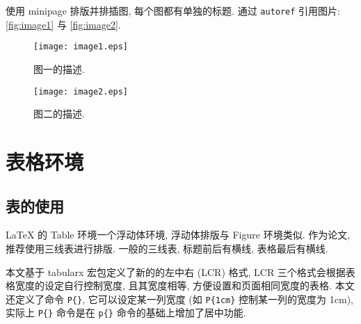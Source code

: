 \documentclass[openany,twoside,12pt]{book}
\theoremstyle{plain}
\begin{document}
使用 minipage 排版并排插图, 每个图都有单独的标题. 通过 \verb|autoref| 引用图片: \autoref{fig:image1} 与 \autoref{fig:image2}.
\begin{figure}[htp!]
\begin{minipage}[t]{0.48\linewidth}
  \centering
  \texttt{[image: image1.eps]}
  \caption{图一的描述.}
  \label{fig:image1}
\end{minipage}
\hfill
\begin{minipage}[t]{0.48\linewidth}
\centering
   \texttt{[image: image2.eps]}
   \caption{图二的描述.}
   \label{fig:image2}
\end{minipage}
\end{figure}





\chapter{表格环境}

\section{表的使用}

LaTeX 的 Table 环境一个浮动体环境, 浮动体排版与 Figure 环境类似. 作为论文, 推荐使用三线表进行排版. 一般的三线表, 标题前后有横线, 表格最后有横线. %

本文基于 tabularx 宏包定义了新的的左中右 (LCR) 格式, LCR 三个格式会根据表格宽度的设定自行控制宽度, 且其宽度相等, 方便设置和页面相同宽度的表格. 本文还定义了命令 \verb|P{}|, 它可以设定某一列宽度 (如 \verb|P{1cm}| 控制某一列的宽度为 1cm), 实际上 \verb|P{}| 命令是在 \verb|p{}| 命令的基础上增加了居中功能. %
\end{document}
